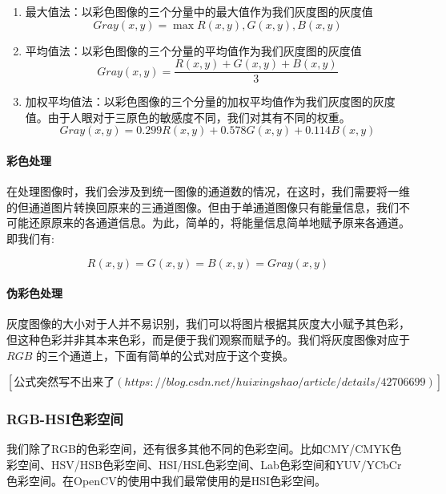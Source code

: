 \begin{enumerate}
	\item 最大值法：以彩色图像的三个分量中的最大值作为我们灰度图的灰度值
	\begin{equation}
		Gray(x,y) = \max{R(x,y),G(x,y),B(x,y)}
	\end{equation}
	\item 平均值法：以彩色图像的三个分量的平均值作为我们灰度图的灰度值
	\begin{equation}
		Gray(x,y) = \frac{R(x,y)+G(x,y)+B(x,y)}{3}
	\end{equation}
	\item 加权平均值法：以彩色图像的三个分量的加权平均值作为我们灰度图的灰度值。由于人眼对于三原色的敏感度不同，我们对其有不同的权重。
	\begin{equation}
		Gray(x,y) = 0.299R(x,y)+ 0.578G(x,y)+ 0.114B(x,y)
	\end{equation}
\end{enumerate}

\paragraph{彩色处理}
在处理图像时，我们会涉及到统一图像的通道数的情况，在这时，我们需要将一维的但通道图片转换回原来的三通道图像。但由于单通道图像只有能量信息，我们不可能还原原来的各通道信息。为此，简单的，将能量信息简单地赋予原来各通道。即我们有:

\begin{equation}
	R(x,y) = G(x,y) = B(x,y) = Gray(x,y)
\end{equation}

\paragraph{伪彩色处理}
灰度图像的大小对于人并不易识别，我们可以将图片根据其灰度大小赋予其色彩，但这种色彩并非其本来色彩，而是便于我们观察而赋予的。我们将灰度图像对应于 $ RGB $ 的三个通道上，下面有简单的公式对应于这个变换。

$ [公式突然写不出来了(https://blog.csdn.net/huixingshao/article/details/42706699)] $


\subsubsection{RGB-HSI色彩空间}

我们除了RGB的色彩空间，还有很多其他不同的色彩空间。比如CMY/CMYK色彩空间、HSV/HSB色彩空间、HSI/HSL色彩空间、Lab色彩空间和YUV/YCbCr色彩空间。在OpenCV的使用中我们最常使用的是HSI色彩空间。

